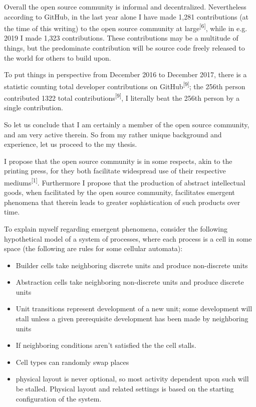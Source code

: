 \documentclass[american, 12pt]{article}
\begin{document}
Overall the open source community is informal and decentralized. Nevertheless according to GitHub, in the last year alone I have made 1,281 contributions (at the time of this writing) to the open source community at large\textsuperscript{[6]}, while in e.g. 2019 I made 1,323 contributions. These contributions may be a multitude of things, but the predominate contribution will be source code freely released to the world for others to build upon. 

To put things in perspective from December 2016 to December 2017, there is a statistic counting total developer contributions on GitHub\textsuperscript{[9]}; the 256th person contributed 1322
total contributions\textsuperscript{[9]}, I literally beat the 256th person by a single contribution.

So let us conclude that I am certainly a member of the open source community, and am very active therein. So from my rather unique background and experience, let us proceed to the my thesis.

I propose that the open source community is in some respects, akin to the printing press, for they both facilitate widespread use of their respective mediums\textsuperscript{[1]}. Furthermore I propose that the production of abstract intellectual goods, when facilitated by the open source community, facilitates emergent phenomena that therein leads to greater sophistication of such products over time.

To explain myself regarding emergent phenomena, consider the following hypothetical model of a system of processes, where each process is a cell in some space (the following are rules for some cellular automata):

\begin{itemize}
\item Builder cells take neighboring discrete units and produce non-discrete units
\item Abstraction cells take neighboring non-discrete units and produce discrete units
\item Unit transitions represent development of a new unit; some development will
stall unless a given prerequisite development has been made by neighboring units
\item If neighboring conditions aren’t satisfied the the cell stalls.
\item Cell types can randomly swap places
\item physical layout is never optional, so most activity dependent upon such will
be stalled. Physical layout and related settings is based on the starting
configuration of the system.
\end{itemize}
\end{document}
